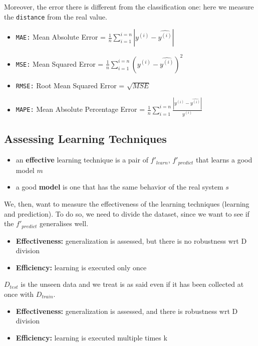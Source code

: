 Moreover, the error there is different from the classification one: here we measure the \texttt{distance} from the real value.

\begin{itemize}
    \item \texttt{MAE:} Mean Absolute Error = $\frac{1}{n}\sum_{i=1}^{i=n}|y^{(i)} - \hat{y^{(i)}}|$
    \item \texttt{MSE:} Mean Squared Error = $\frac{1}{n}\sum_{i=1}^{i=n}(y^{(i)} - \hat{y^{(i)}})^2$   
    \item \texttt{RMSE:} Root Mean Squared Error = $\sqrt{MSE}$
    \item \texttt{MAPE:} Mean Absolute Percentage Error = $\frac{1}{n}\sum_{i=1}^{i=n}\frac{|y^{(i)} - \hat{y^{(i)}}|}{y^{(i)}}$
\end{itemize}

\subsection{Assessing Learning Techniques}
\begin{itemize}
    \item an \textbf{effective} learning technique is a pair of $f'_{learn}$, $f'_{predict}$ that learns a good model $m$
    \item a good \textbf{model} is one that has the same behavior of the real system $s$
\end{itemize}

We, then, want to measure the effectiveness of the learning techniques (learning and prediction).
To do so, we need to divide the dataset, since we want to see if the $f'_{predict}$ generalises well.

\begin{definitionblock}
    \begin{itemize}
        \item \textbf{Effectiveness:} generalization is assessed, but there is no robustness wrt D division 
        \item \textbf{Efficiency:} learning is executed only once 
    \end{itemize}
    $D_{test}$ is the unseen data and we treat is as said even if it has been collected at once with $D_{train}$.
\end{definitionblock}

\begin{definitionblock}
    \begin{itemize}
        \item \textbf{Effectiveness:} generalization is assessed, and there is robustness wrt D division 
        \item \textbf{Efficiency:} learning is executed multiple times \propto k
    \end{itemize}
\end{definitionblock}

